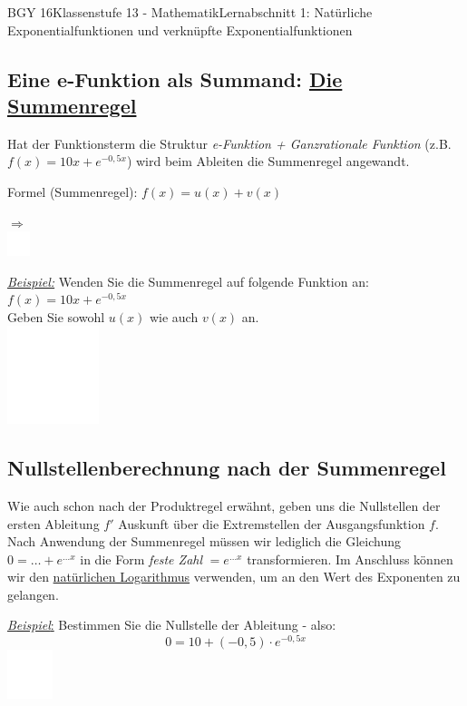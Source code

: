 \documentclass[11pt,twocolumn,oneside,openany,headings=optiontotoc,11pt,numbers=noenddot]{article}
\begin{document}
\begin{worksheet}{BGY 16}{Klassenstufe 13 - Mathematik}{Lernabschnitt 1: Natürliche Exponentialfunktionen und verknüpfte Exponentialfunktionen}
		\subsection{Eine e-Funktion als Summand: \underline{Die Summenregel}}
		Hat der Funktionsterm die Struktur \grqq{}\textit{e-Funktion + Ganzrationale Funktion}\grqq{} (z.B. \(f(x) = 10x + e^{-0,5x}\)) wird beim Ableiten die Summenregel angewandt.\\
		\par\noindent
		\begin{framed}
			\noindent
			Formel (\small{Summenregel}\normalsize): \(f(x) = u(x) + v(x)\)\\
			\par\noindent
			$\Rightarrow$\\
			\includegraphics[width=0.05\textwidth]{../../empty.jpg}
		\end{framed}
		\noindent
		\underline{\textit{Beispiel:}} Wenden Sie die Summenregel auf folgende Funktion an: \(f(x) = 10x + e^{-0,5x}\)\\
		Geben Sie sowohl \(u(x)\) wie auch \(v(x)\) an.\\
		\includegraphics[width=0.2\textwidth]{../../empty.jpg}
		\subsection{Nullstellenberechnung nach der Summenregel}
		Wie auch schon nach der Produktregel erwähnt, geben uns die Nullstellen der ersten Ableitung \(f'\) Auskunft über die Extremstellen der Ausgangsfunktion \(f\). Nach Anwendung der Summenregel müssen wir lediglich die Gleichung \(0 = \ldots{} + e^{\ldots{}x}\) in die Form \textit{feste Zahl} \(= e^{\ldots{}x}\) transformieren. Im Anschluss können wir den \underline{natürlichen Logarithmus} verwenden, um an den Wert des Exponenten zu gelangen.\\
		\par\noindent
		\underline{\textit{Beispiel}:} Bestimmen Sie die Nullstelle der Ableitung - also:
		\[0 = 10+ (-0,5)\cdot{}e^{-0,5x}\]
		\includegraphics[width=0.1\textwidth]{../../empty.jpg}

\end{worksheet}
\end{document}
